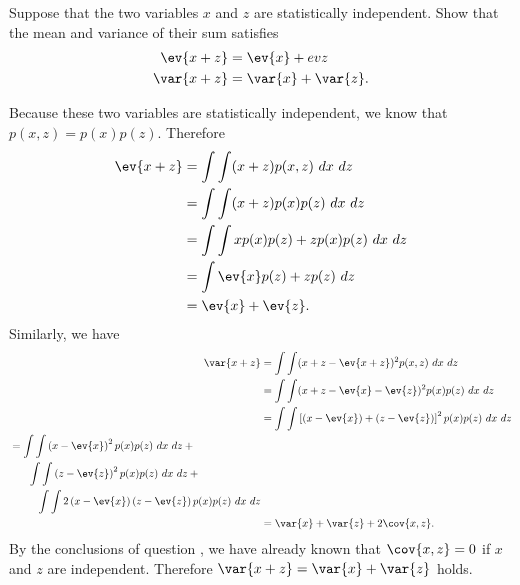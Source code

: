 \begin{question}{1.10}
	Suppose that the two variables $x$ and $z$ are statistically independent. Show that the mean and variance of their sum satisfies
	\begin{align*}
		\ev{x + z} &= \ev{x} + ev{z}\\
		\var{x + z} &= \var{x} + \var{z}.
	\end{align*}
\end{question}

\begin{answer}{}
	Because these two variables are statistically independent, we know that $p(x,z) = p(x)p(z)$. Therefore
	\begin{align}
		\ev{x+z} &=\int\int (x+z)p(x,z)\ dx\ dz\\
		&= \int\int (x+z)p(x)p(z)\ dx \ dz\\
		&= \int\int xp(x)p(z) + zp(x)p(z) \ dx\ dz\\
		&= \int \ev{x}p(z) + zp(z)\ dz\\
		&= \ev{x} + \ev{z}.
	\end{align}
	Similarly, we have
	\newlength{\tempeqn}
	\settowidth{\tempeqn}{$=$}
	\begin{align}
		\var{x+z} &= \int\int (x + z- \ev{x + z})^2 p(x,z)\ dx\ dz\\
		&= \int\int (x + z- \ev{x} - \ev{z})^2 p(x)p(z)\ dx\ dz\\
		&= \int\int \left[\left(x - \ev{x}\right)+(z-\ev{z})\right]^2 p(x)p(z)\ dx\ dz\\
		\begin{split}
		&=\int\int \left(x - \ev{x}\right)^2p(x)p(z)\ dx\ dz + {}\\
		&\phantom{=}\quad\int\int \left(z - \ev{z}\right)^2p(x)p(z)\ dx\ dz + {}\\
		&\phantom{=}\quad\quad{\int\int 2\left(x-\ev{x}\right)\left(z-\ev{z}\right)p(x)p(z)\ dx\ dz}
		\end{split}\\
		&= \var{x} + \var{z} + 2\cov{x,z}.
	\end{align}
	By the conclusions of question , we have already known that $\cov{x,z} = 0$ if $x$ and $z$ are independent. Therefore $\var{x+z} = \var{x} + \var{z}$ holds.
\end{answer}